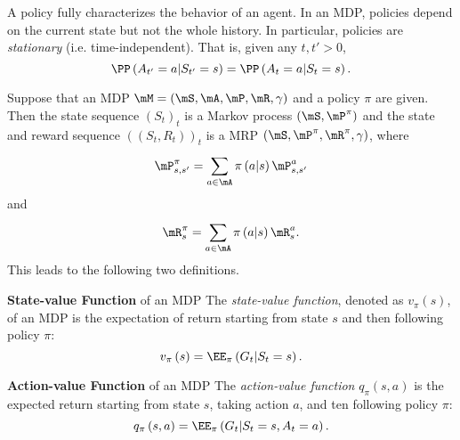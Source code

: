 \documentclass[RL]{subfiles}
\begin{document}
    \np A policy fully characterizes the behavior of an agent. In an MDP, policies depend on the current state but not the whole history. In particular, policies are \textit{stationary} (i.e. time-independent). That is, given any $t,t'>0$,
    \begin{equation*}
        \PP\left( A_{t'}=a|S_{t'}=s \right) = \PP\left( A_t=a|S_t=s \right).
    \end{equation*}

    \np Suppose that an MDP $\mM = \left( \mS,\mA,\mP,\mR,\gamma \right)$ and a policy $\pi$ are given. Then the state sequence $\left( S_{t} \right)^{}_{t}$ is a Markov process $\left( \mS,\mP^{\pi} \right)$ and the state and reward sequence $\left( \left( S_t,R_t \right) \right)_t$ is a MRP $\left( \mS,\mP^{\pi},\mR^{\pi},\gamma \right)$, where
    \begin{equation*}
        \mP^{\pi}_{s,s'} = \sum^{}_{a\in\mA} \pi\left( a|s \right)\mP^a_{s,s'}
    \end{equation*}
    and
    \begin{equation*}
        \mR^{\pi}_s = \sum^{}_{a\in\mA} \pi\left( a|s \right)\mR^a_s.
    \end{equation*}
    This leads to the following two definitions.

    \begin{definition}{\textbf{State-value Function} of an MDP}
        The \emph{state-value function}, denoted as $v_{\pi}\left( s \right)$, of an MDP is the expectation of return starting from state $s$ and then following policy $\pi$:
        \begin{equation*}
            v_{\pi}\left( s \right) = \EE_{\pi}\left( G_t|S_t=s \right).
        \end{equation*}
    \end{definition}

    \begin{definition}{\textbf{Action-value Function} of an MDP}
        The \emph{action-value function} $q_{\pi}\left( s,a \right)$ is the expected return starting from state $s$, taking action $a$, and ten following policy $\pi$:
        \begin{equation*}
            q_{\pi}\left( s,a \right) = \EE_{\pi}\left( G_t|S_t=s, A_t=a \right).
        \end{equation*}
    \end{definition}
\end{document}
